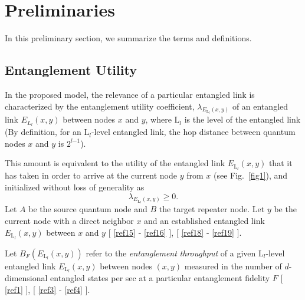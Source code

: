 \documentclass[11pt]{article}%
\newcommand{\fref}[1]{Fig.~\ref{#1}}
\newcommand*{\cref}[1]{%
  \begingroup
    \hypersetup{
      linkcolor=linkequation,
      linkbordercolor=linkequation,
    }%
    \ref{#1}%
  \endgroup
}
\begin{document}
 
\section{Preliminaries }
\label{sec2}
In this preliminary section, we summarize the terms and definitions. 
  
\subsection{Entanglement Utility}

 In the proposed model, the relevance of a particular entangled link is characterized by the entanglement utility\textit{ }coefficient, ${\lambda}_{E_{{\mathrm{L}}_l}\left(x,y\right)}$ of an entangled link\textit{ }$E_{L_l}\left(x,y\right)$ between nodes $x$ and $y$, where ${\mathrm{L}}_l$ is the level of the entangled link (By definition, for an ${\mathrm{L}}_l$-level entangled link, the hop distance between quantum nodes $x$ and $y$ is ${\mathrm{2}}^{l\mathrm{-}\mathrm{1}}$).

 This amount is equivalent to the utility of the entangled link $E_{{\mathrm{L}}_l}\left(x,y\right)$ that it has taken in order to arrive at the current node $y$ from $x$ (see \fref{fig1}), and initialized without loss of generality as 
\begin{equation} \label{1)} 
{\lambda }_{E_{{\mathrm{L}}_l}\left(x,y\right)}\mathrm{\ge }\mathrm{0}.                                                                 
\end{equation} 
Let $A$ be the source quantum node and $B$ the target repeater node. Let $y$ be the current node with a direct neighbor $x$ and an established entangled link $E_{{\mathrm{L}}_l}\left(x,y\right)$ between $x$ and $y$ [\cref{ref15}-\cref{ref16}], [\cref{ref18}-\cref{ref19}]. 

 Let $B_F\left(E_{{\mathrm{L}}_l}\left(x,y\right)\right)$ refer to the \textit{entanglement} \textit{throughput} of a given ${\mathrm{L}}_l$-level entangled link $E_{{\mathrm{L}}_l}\left(x,y\right)$ between nodes $\left(x,y\right)$ measured in the number of $d$-dimensional entangled states per sec at a particular entanglement fidelity $F$ [\cref{ref1}], [\cref{ref3}-\cref{ref4}].   
\end{document}
